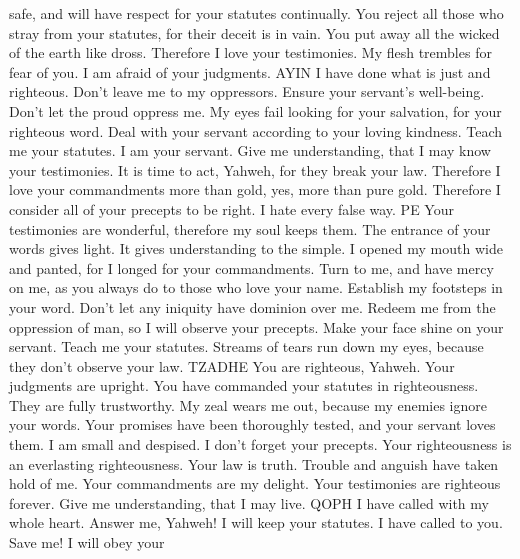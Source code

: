 safe, and will have respect for your statutes continually.
 You reject all those who stray from your statutes, for
their deceit is in vain.  You put away all the wicked of
the earth like dross. Therefore I love your testimonies.
 My flesh trembles for fear of you. I am afraid of your
judgments. AYIN  I have done what is just and righteous.
Don't leave me to my oppressors.  Ensure your servant's
well-being. Don't let the proud oppress me.  My eyes
fail looking for your salvation, for your righteous word.
 Deal with your servant according to your loving
kindness. Teach me your statutes.  I am your servant.
Give me understanding, that I may know your testimonies.
 It is time to act, Yahweh, for they break your law.
 Therefore I love your commandments more than gold, yes,
more than pure gold.  Therefore I consider all of your
precepts to be right. I hate every false way. PE  Your
testimonies are wonderful, therefore my soul keeps them.
 The entrance of your words gives light. It gives
understanding to the simple.  I opened my mouth wide and
panted, for I longed for your commandments.  Turn to me,
and have mercy on me, as you always do to those who love your name.
 Establish my footsteps in your word. Don't let any
iniquity have dominion over me.  Redeem me from the
oppression of man, so I will observe your precepts. 
Make your face shine on your servant. Teach me your statutes.
 Streams of tears run down my eyes, because they don't
observe your law. TZADHE  You are righteous, Yahweh.
Your judgments are upright.  You have commanded your
statutes in righteousness. They are fully trustworthy. 
My zeal wears me out, because my enemies ignore your words.
 Your promises have been thoroughly tested, and your
servant loves them.  I am small and despised. I don't
forget your precepts.  Your righteousness is an
everlasting righteousness. Your law is truth.  Trouble
and anguish have taken hold of me. Your commandments are my delight.
 Your testimonies are righteous forever. Give me
understanding, that I may live. QOPH  I have called with
my whole heart. Answer me, Yahweh! I will keep your statutes.
 I have called to you. Save me! I will obey your

